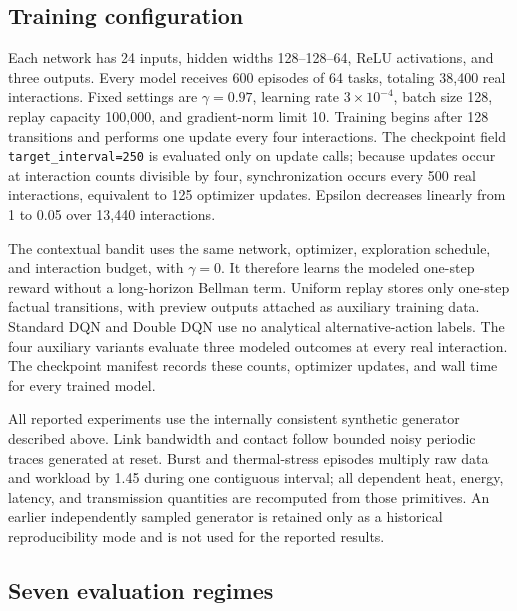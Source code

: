 \documentclass[11pt]{article}
\begin{document}
\subsection{Training configuration}

\color{red}%
Each network has 24 inputs, hidden widths 128--128--64, ReLU activations, and three outputs. Every model receives 600 episodes of 64 tasks, totaling 38,400 real interactions. Fixed settings are $\gamma=0.97$, learning rate $3\times10^{-4}$, batch size 128, replay capacity 100,000, and gradient-norm limit 10. Training begins after 128 transitions and performs one update every four interactions. The checkpoint field \texttt{target\_interval=250} is evaluated only on update calls; because updates occur at interaction counts divisible by four, synchronization occurs every 500 real interactions, equivalent to 125 optimizer updates. Epsilon decreases linearly from 1 to 0.05 over 13,440 interactions.
\color{black}%

\color{red}%
The contextual bandit uses the same network, optimizer, exploration schedule, and interaction budget, with $\gamma=0$. It therefore learns the modeled one-step reward without a long-horizon Bellman term. Uniform replay stores only one-step factual transitions, with preview outputs attached as auxiliary training data. Standard DQN and Double DQN use no analytical alternative-action labels. The four auxiliary variants evaluate three modeled outcomes at every real interaction. The checkpoint manifest records these counts, optimizer updates, and wall time for every trained model.
\color{black}%

\color{red}%
All reported experiments use the internally consistent synthetic generator described above. Link bandwidth and contact follow bounded noisy periodic traces generated at reset. Burst and thermal-stress episodes multiply raw data and workload by 1.45 during one contiguous interval; all dependent heat, energy, latency, and transmission quantities are recomputed from those primitives. An earlier independently sampled generator is retained only as a historical reproducibility mode and is not used for the reported results.
\color{black}%

\subsection{Seven evaluation regimes}
\end{document}
